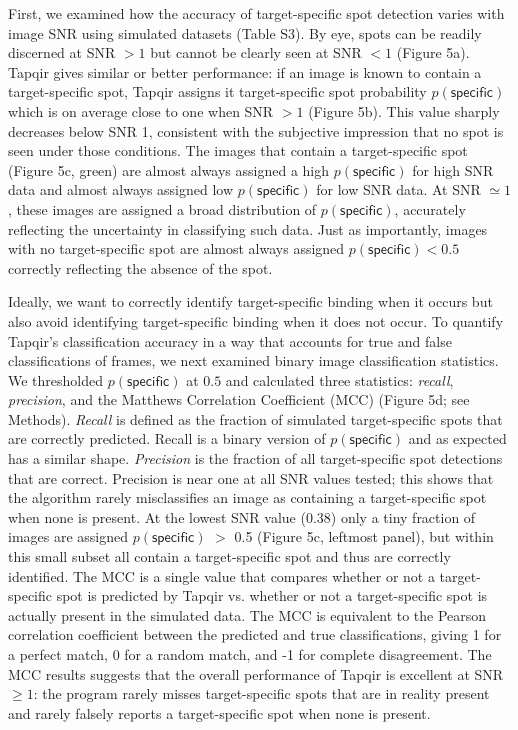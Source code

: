 First, we examined how the accuracy of target-specific spot detection varies with  image SNR using simulated datasets (Table S3). By eye, spots can be readily discerned at SNR $>1$ but cannot be clearly seen at SNR $<1$ (Figure 5a). Tapqir gives similar or better performance:  if an image is known to contain a target-specific spot, Tapqir assigns it target-specific spot probability $p(\mathsf{specific})$ which is on average close to  one when SNR $>1$ (Figure 5b).  This value sharply decreases below SNR 1, consistent with the subjective impression that no spot is seen under those conditions.  The images that contain a target-specific spot (Figure 5c, green) are almost always assigned a high $p(\mathsf{specific})$ for high SNR data and almost always assigned low $p(\mathsf{specific})$ for low SNR data.  At SNR $\simeq 1$, these images are assigned a broad distribution of $p(\mathsf{specific})$, accurately reflecting the uncertainty in classifying such data.  Just as importantly, images with no target-specific spot are almost always assigned $p(\mathsf{specific}) < 0.5$ correctly reflecting the absence of the spot.

Ideally, we want to correctly identify target-specific binding when it occurs but also avoid identifying target-specific binding when it does not occur. To quantify Tapqir's classification accuracy in a way that accounts for true and false classifications of frames, we next examined binary image classification statistics. We thresholded $p(\mathsf{specific})$ at $0.5$ and calculated three statistics: \textit{recall}, \textit{precision}, and the Matthews Correlation Coefficient (MCC) \cite{Matthews1975-rw} (Figure 5d; see Methods). \textit{Recall} is defined as the fraction of simulated target-specific spots that are correctly predicted. Recall is a binary version of $p(\mathsf{specific})$ and as expected has a similar shape. \textit{Precision} is the fraction of all target-specific spot detections that are correct. Precision is near one at all SNR values tested; this shows that the algorithm rarely misclassifies an image as containing a target-specific spot when none is present. At the lowest SNR value (0.38) only a tiny fraction of images are assigned $p(\mathsf{specific})$ $>$ 0.5 (Figure 5c, leftmost panel), but within this small subset all contain a target-specific spot and thus are correctly identified. The MCC is a single value that compares whether or not a target-specific spot is predicted by Tapqir vs. whether or not a target-specific spot is actually present in the simulated data.  The MCC is equivalent to the Pearson correlation coefficient between the predicted and true classifications, giving 1 for a perfect match, 0 for a random match, and -1 for complete disagreement. The MCC results suggests that the overall performance of Tapqir is excellent at SNR $\ge 1$: the program rarely misses target-specific spots that are in reality present and rarely falsely reports a target-specific spot when none is present.  

